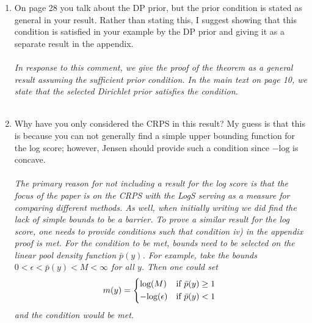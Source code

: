 \documentclass[ba]{imsart}
\newcommand{\1}[1]{\mathds{1}\left[#1\right]}
\begin{document}
\begin{enumerate}[(1)]
  \begin{enumerate}[1.]
    \item On page 28 you talk about the DP prior, but the prior condition is 
    stated as general in
  your result. Rather than stating this, I suggest showing that this condition 
  is satisfied in
  your example by the DP prior and giving it as a separate result in the 
  appendix.
  \\~\\
 \emph{In response to this comment, we give the proof of the theorem as a 
 general result assuming the sufficient prior condition. In the main text on 
 page 10, we state that the selected Dirichlet prior satisfies the condition.}
    \\~\\
    \item Why have you only considered the CRPS in this result? My guess is that 
    this is because
    you can not generally find a simple upper bounding function for the log 
    score; 
    however,
    Jensen should provide such a condition since $-\text{log}$ is concave.
    \\~\\
    
  \emph{The primary reason for not including a result for the log score is
    that the focus of the paper is on the CRPS with the LogS serving as a 
    measure for comparing different methods. As well, when initially writing we
    did find the lack of simple bounds to be a barrier.
    To prove a similar result for the log score, one needs to provide conditions
    such that condition iv) in the appendix proof is met. For the condition to
    be met, bounds need to be selected on
    the linear pool density function $\bar{p}(y)$. 
    For example, take the bounds 
    $0 < \epsilon < \bar{p}(y) < M < \infty$ for all $y$.
    Then one could set 
    \[
     m(y) = 
      \begin{cases*}
        \text{log}(M)  & if \(\bar{p}(y) \ge 1\) \\
        -\text{log}(\epsilon)   & if \(\bar{p}(y) < 1\)
      \end{cases*}
    \]
    and the condition would be met.
    }
  \end{enumerate}
  

\end{enumerate}
\end{document}
